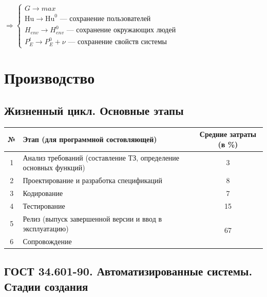 \documentclass[12pt]{article}
\begin{document}
\begin{sloppypar}
    $\Rightarrow \begin{cases}
            G \rightarrow max                                                    \\
            \text{Hu} \rightarrow \text{Hu}^0 \text{ — сохранение пользователей} \\
            H_{env} \rightarrow H_{env}^0 \text{ — сохранение окружающих людей}  \\
            P_E^t \rightarrow P_E^0 + \nu \text{ — сохранение свойств системы}
        \end{cases}$

    \section{Производство}


    \subsection{Жизненный цикл. Основные этапы}
    \begin{tabular}{|c|l|c|}
        \hline
        № & Этап (для программной состовляющей)                              & Средние затраты (в \%) \\
        \hline
        1 & Анализ требований (составление ТЗ, определение основных функций) & 3                      \\
        \hline
        2 & Проектирование и разработка спецификаций                         & 8                      \\
        \hline
        3 & Кодирование                                                      & 7                      \\
        \hline
        4 & Тестирование                                                     & 15                     \\
        \hline
        5 & Релиз (выпуск завершенной версии и ввод в эксплуатацию)          & \multirow{2}{*}{67}    \\
        \cline{1-2}
        6 & Сопровождение                                                    &                        \\
        \hline
    \end{tabular}

    \subsection{ГОСТ 34.601-90. Автоматизированные системы. Стадии создания}


\end{sloppypar}
\end{document}
